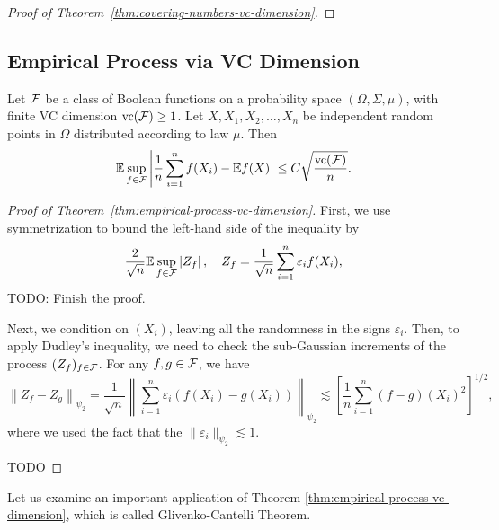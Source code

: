  \begin{proof}[Proof of Theorem~\ref{thm:covering-numbers-vc-dimension}]
 \end{proof}

\subsection{Empirical Process via VC Dimension}

\begin{theorem}
    \label{thm:empirical-process-vc-dimension}
    Let \({\mathcal F}\) be a class of Boolean functions on a probability space \((\Omega,\Sigma,\mu)\), with finite VC dimension \(\text{vc}({\mathcal F})\geq 1\). Let \(X,X_{1},X_{2},\ldots,X_{n}\) be independent random points in \(\Omega\) distributed according to law \(\mu\). Then
    \begin{equation*}
        {\mathbb E}\sup_{f\in{\mathcal F}}\left|\frac{1}{n}\sum_{i=1}^{n}f(X_{i})-{\mathbb E} f(X)\right|\leq C\sqrt{\frac{\text{vc}({\mathcal F})}{n}}.
    \end{equation*}
\end{theorem}

\begin{proof}[Proof of Theorem~\ref{thm:empirical-process-vc-dimension}]
    First, we use symmetrization to bound the left-hand side of the inequality by
    \begin{equation*}
        \frac{2}{\sqrt{n}}{\mathbb E}\sup_{f\in{\mathcal F}}\left|Z_{f}\right|,\quad Z_{f}=\frac{1}{\sqrt{n}}\sum_{i=1}^{n}\varepsilon_{i}f(X_{i}),
    \end{equation*}
    TODO: Finish the proof.

    Next, we condition on \((X_{i})\), leaving all the randomness in the signs \(\varepsilon_{i}\). Then, to apply Dudley's inequality, we need to check the sub-Gaussian increments of the process \((Z_{f})_{f\in{\mathcal F}}\). For any \(f,g\in{\mathcal F}\), we have
    \begin{equation*}
        \left\|Z_{f}-Z_{g}\right\|_{\psi_{2}}=\frac{1}{\sqrt{n}}\left\|\sum_{i=1}^{n}\varepsilon_{i}(f(X_{i})-g(X_{i}))\right\|_{\psi_{2}}\lesssim\left[\frac{1}{n}\sum_{i=1}^{n}(f-g)(X_{i})^{2}\right]^{1/2},
    \end{equation*}
    where we used the fact that the \(\|\varepsilon_{i}\|_{\psi_{2}}\lesssim 1\).


    TODO
\end{proof}

Let us examine an important application of Theorem \ref{thm:empirical-process-vc-dimension}, which is called Glivenko-Cantelli Theorem.


